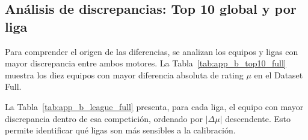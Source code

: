 \subsection{An\'alisis de discrepancias: Top 10 global y por liga}

Para comprender el origen de las diferencias, se analizan los equipos y ligas con mayor discrepancia entre ambos motores. La Tabla~\ref{tab:app_b_top10_full} muestra los diez equipos con mayor diferencia absoluta de rating $\mu$ en el Dataset Full.

\begin{table}[htbp]
	\centering
	\caption{Top 10 global de equipos con mayor $|\Delta \mu|$ (Dataset Full).}
	\label{tab:app_b_top10_full}
	\small
\end{table}

\newpage

La Tabla~\ref{tab:app_b_league_full} presenta, para cada liga, el equipo con mayor discrepancia dentro de esa competici\'on, ordenado por $|\Delta \mu|$ descendente. Esto permite identificar qu\'e ligas son m\'as sensibles a la calibraci\'on.

